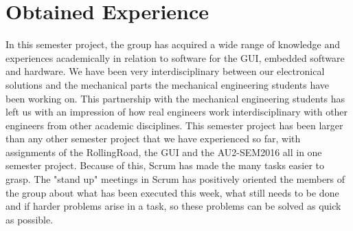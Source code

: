 \chapter{Obtained Experience}
In this semester project, the group has acquired a wide range of knowledge and experiences academically in relation to software for the GUI, embedded software and hardware. We have been very interdisciplinary between our electronical solutions and the mechanical parts the mechanical engineering students have been working on. This partnership with the mechanical engineering students has left us with an impression of how real engineers work interdisciplinary with other engineers from other academic disciplines. This semester project has been larger than any other semester project that we have experienced so far, with assignments of the RollingRoad, the GUI and the AU2-SEM2016 all in one semester project. Because of this, Scrum has made the many tasks easier to grasp. The "stand up" meetings in Scrum has positively oriented the members of the group about what has been executed this week, what still needs to be done and if harder problems arise in a task, so these problems can be solved as quick as possible.







